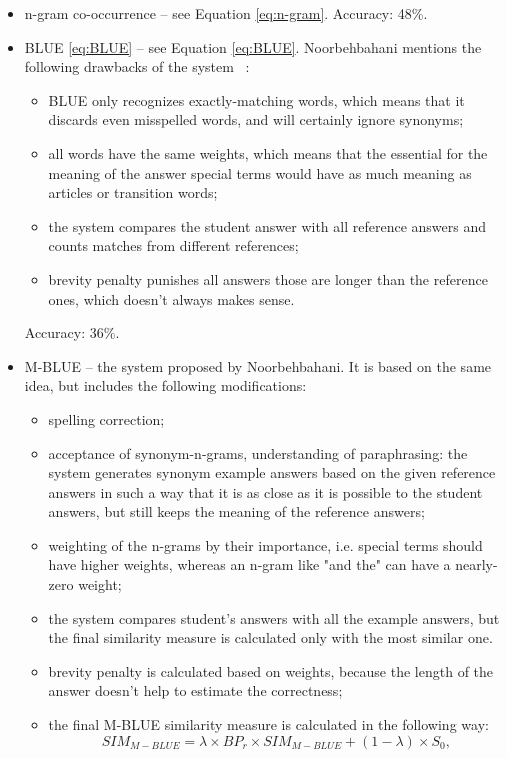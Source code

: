 \begin{itemize}
\item n-gram co-occurrence -- see Equation \ref{eq:n-gram}. Accuracy: 48\%.
\item BLUE \ref{eq:BLUE} -- see Equation \ref{eq:BLUE}. Noorbehbahani mentions the following drawbacks of the system ~\cite{Noorbehbahani}:
\begin{itemize}
\item BLUE only recognizes exactly-matching words, which means that it discards even misspelled words, and will certainly ignore synonyms;
\item all words have the same weights, which means that the essential for the meaning of the answer special terms would have as much meaning as articles or transition words;
\item the system compares the student answer with all reference answers and counts matches from different references;
\item brevity penalty punishes all answers those are longer than the reference ones, which doesn't always makes sense.
\end{itemize}
Accuracy: 36\%.
\item M-BLUE -- the system proposed by Noorbehbahani. It is based on the same idea, but includes the following modifications:
\begin{itemize}
\item spelling correction;
\item acceptance of synonym-n-grams, understanding of paraphrasing: the system generates synonym example answers based on the given reference answers in such a way that it is as close as it is possible to the student answers, but still keeps the meaning of the reference answers;
\item weighting of the n-grams by their importance, i.e. special terms should have higher weights, whereas an n-gram like "and the" can have a nearly-zero weight;
\item the system compares student's answers with all the example answers, but the final similarity measure is calculated only with the most similar one.
\item brevity penalty is calculated based on weights, because the length of the answer doesn't help to estimate the correctness;
\item the final M-BLUE similarity measure is calculated in the following way:
\begin{equation} \label{eq:M-BLUE}
SIM_{M-BLUE} = \lambda \times BP_r \times SIM_{M-BLUE} + (1 - \lambda) \times S_0,

\end{equation}
\end{itemize}
\end{itemize}
